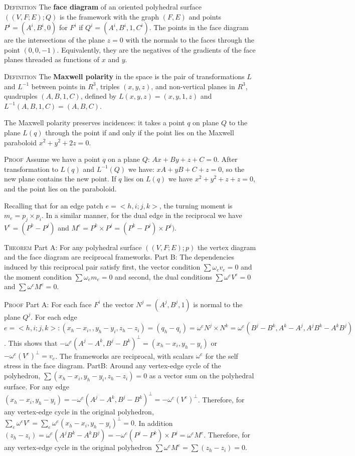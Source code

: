 \documentclass[11pt]{article}
\begin{document}
\textsc{Definition} The \textbf{face diagram} of an oriented polyhedral surface $((V,F;E);Q)$ is the framework with the graph $(F,E)$ and points $P^i = (A^i,B^i,0)$ for $F^i$ if $Q^i = (A^i,B^i,1,C^i)$. The points in the face diagram are the intersections of the plane $z=0$ with the normals to the faces through the point $(0,0,-1)$. Equivalently, they are the negatives of the gradients of the face planes threaded as functions of $x$ and $y$.
 
 \textsc{Definition} The \textbf{Maxwell polarity} in the space is the pair of transformations $L$ and $L^{-1}$ between points in $R^3$, triples $(x,y,z)$, and non-vertical planes in $R^3$, quadruples $(A,B,1,C)$, defined by $L(x,y,z)=(x,y,1,z)$ and $L^{-1}(A,B,1,C) = (A,B,C)$.
 
 The Maxwell polarity preserves incidences: it takes a point $q$ on plane $Q$ to the plane $L(q)$ through the point if and only if the point lies on the Maxwell paraboloid $x^2 + y^2 + 2z = 0$.
 
 \textsc{Proof} Assume we have a point $q$ on a plane $Q$: $Ax + By + z + C = 0$. After transformation to $L(q)$ and $L^{-1}(Q)$ we have: $xA + yB + C + z = 0$, so the new plane contains the new point. If $q$ lies on $L(q)$ we have $x^2 + y^2 + z + z = 0$, and the point lies on the paraboloid. 
 
 Recalling that for an edge patch $e = <h,i;j,k>$, the turning moment is $m_e = p_j \times p_i$. In a similar manner, for the dual edge in the reciprocal we have $V^e = (P^k - P^j)$ and $M^e = P^k \times P^j = (P^k - P^j)\times P^j)$.
 
 \textsc{Theorem} Part A: For any polyhedral surface $((V,F;E);p)$ the vertex diagram and the face diagram are reciprocal frameworks.
 Part B: The dependencies induced by this reciprocal pair satisfy first, the vector condition $\sum \omega_e v_e = 0$ and the moment condition $\sum \omega_e m_e = 0$ and second, the dual conditions $\sum \omega^e V^e = 0$ and $\sum \omega^e M^e = 0$.
 
 \textsc{Proof} Part A: For each face $F^i$ the vector $N^j = (A^j, B^j,1)$ is normal to the plane $Q^j$. For each edge $e = <h,i;j,k>:  (x_h-x_i,,y_h-y_i, z_h-z_i)=(q_h-q_i) = \omega^e N^j \times N^k = \omega^e(B^j-B^k,A^k-A^j,A^jB^k-A^kB^j)$. This shows that $-\omega^e(A^j-A^k,B^j-B^k)^\bot = (x_h - x_i, y_h-y_i)$ or $-\omega^e(V^e)^\bot = v_e$. The frameworks are reciprocal, with scalars $\omega^e$ for the self stress in the face diagram.
 PartB: Around any vertex-edge cycle of the polyhedron, $\sum(x_h - x_i, y_h-y_i, z_h-z_i) = 0$ as a vector sum on the polyhedral surface. For any edge $(x_h-x_i,y_h-y_i) = -\omega^e(A^j-A^k,B^j-B^k)^\bot = -\omega^e(V^e)^\bot$. Therefore, for any vertex-edge cycle in the original polyhedron, $\sum_e \omega^eV^e = \sum_e \omega^e(x_h-x_i,y_h-y_i)^\bot = 0$. In addition $(z_h-z_i) = \omega^e(A^jB^k-A^kB^j) = -\omega^e(P^j-P^k) \times P^j = \omega^eM^e$. Therefore, for any vertex-edge cycle in the original polyhedron $\sum \omega^eM^e = \sum(z_h-z_i) = 0$. 
 
\end{document}
